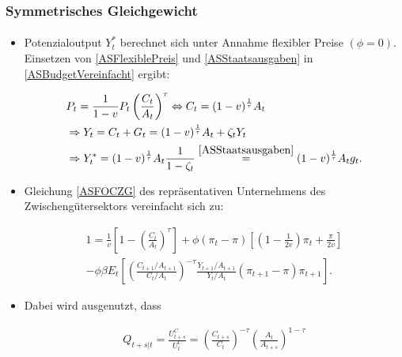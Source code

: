 \documentclass[10pt]{beamer}  %
\begin{document}
\begin{frame}
\frametitle{Symmetrisches Gleichgewicht}\framesubtitle{}
\begin{itemize}
\item Potenzialoutput $Y_t^*$ berechnet sich unter Annahme flexibler Preise $(\phi=0)$. Einsetzen von \eqref{ASFlexiblePreis} und \eqref{ASStaatsausgaben} in \eqref{ASBudgetVereinfacht} ergibt:
\begin{scriptsize}\begin{eqnarray}
  &P_t= \frac{1}{1-v} P_t\left(\frac{C_t}{A_t}\right)^\tau \Leftrightarrow C_t = (1-v)^{\frac{1}{\tau}} A_t\nonumber\\
  &\Rightarrow Y_t = C_t + G_t = (1-v)^{\frac{1}{\tau}} A_t + \zeta_t Y_t \nonumber\\
  &\Rightarrow Y_t^* = (1-v)^{\frac{1}{\tau}} A_t \frac{1}{1-\zeta_t} \overset{\eqref{ASStaatsausgaben}}{=} (1-v)^{\frac{1}{\tau}} A_t g_t.\label{ASPotentialOutput}
\end{eqnarray}\end{scriptsize}
\item Gleichung \eqref{ASFOCZG} des repr\"{a}sentativen Unternehmens des Zwischeng\"{u}tersektors vereinfacht sich zu:
\begin{scriptsize}\begin{multline}\label{ASMarkUpPreis}
  1 = \frac{1}{v}\left[1-\left(\frac{C_t}{A_t}\right)^{\tau}\right] + \phi (\pi_t-\pi)\left[\left(1-\frac{1}{2v}\right)\pi_t + \frac{\pi}{2v}\right] \\
  -  \phi\beta E_t\left[ \left(\frac{C_{t+1}/A_{t+1}}{C_t/A_t}\right)^{-\tau} \frac{Y_{t+1}/A_{t+1}}{Y_t/A_t}  (\pi_{t+1}-\pi)\pi_{t+1}\right].
\end{multline}\end{scriptsize}
\item Dabei wird ausgenutzt, dass
\begin{scriptsize}\begin{align}\label{TobinQ}
  Q_{t+s|t} = \frac{U_{t+s}^C}{U_t^C}=\left(\frac{C_{t+s}}{C_t}\right)^{-\tau} \left(\frac{A_{t}}{A_{t+s}}\right)^{1-\tau}
\end{align}\end{scriptsize}
\end{itemize}
\end{frame}
\end{document}
